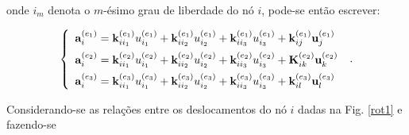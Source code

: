 \noindent onde \(i_m\) denota o \(m\)-ésimo grau de liberdade do nó \(i\), pode-se então escrever:

\begin{equation} \left\{ \begin{array}{l}\label{intf1}
		\mathbf{a}_{i}^{(e_1)}=\mathbf{k}_{ii_1}^{(e_1)}{u}_{i_1}^{(e_1)}+\mathbf{k}_{ii_2}^{(e_1)}{u}_{i_2}^{(e_1)}+\mathbf{k}_{ii_3}^{(e_1)}{u}_{i_3}^{(e_1)}+\mathbf{k}_{ij}^{(e_1)}\mathbf{u}_{j}^{(e_1)} \vspace{5pt} \\
		\mathbf{a}_{i}^{(e_2)}=\mathbf{k}_{ii_1}^{(e_2)}u_{i_1}^{(e_2)}+\mathbf{k}_{ii_2}^{(e_2)}u_{i_2}^{(e_2)}+\mathbf{k}_{ii_3}^{(e_2)}u_{i_3}^{(e_2)}+\mathbf{K}_{ik}^{(e_2)}\mathbf{u}_{k}^{(e_2)} \vspace{5pt}       \\
		\mathbf{a}_{i}^{(e_3)}=\mathbf{k}_{ii_1}^{(e_3)}u_{i_1}^{(e_3)}+\mathbf{k}_{ii_2}^{(e_3)}u_{i_2}^{(e_3)}+\mathbf{k}_{ii_3}^{(e_3)}u_{i_3}^{(e_3)}+\mathbf{k}_{il}^{(e_3)}\mathbf{u}_{l}^{(e_3)}
	\end{array}  \right. \;.
\end{equation}

\noindent Considerando-se as relações entre os deslocamentos do nó \(i\) dadas na Fig.  \ref{rot1} e fazendo-se

